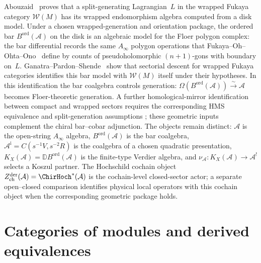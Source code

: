 \begin{remark}
\label{rem:fukaya-bar-koszul}
Abouzaid~\cite{AbouzaidGeneration} proves that a split-generating
Lagrangian~$L$ in the wrapped Fukaya category $\mathcal{W}(M)$ has its
wrapped endomorphism algebra computed from a disk model.
Under a chosen wrapped-generation and orientation package, the ordered
bar \(B^{\mathrm{ord}}(\mathcal A)\) on the disk is an algebraic model
for the Floer polygon complex: the bar differential records the same
$A_\infty$ polygon operations that Fukaya--Oh--Ohta--Ono~\cite{FOOO09}
define by counts of pseudoholomorphic $(n+1)$-gons with boundary
on~$L$.
Ganatra--Pardon--Shende~\cite{GPSSectorialDescent} show that sectorial
descent for wrapped Fukaya categories identifies this bar model with
$\mathcal{W}(M)$ itself under their hypotheses. In this identification
the bar coalgebra controls generation:
$\Omega(B^{\mathrm{ord}}(\mathcal{A})) \xrightarrow{\sim} \mathcal{A}$
becomes Floer-theoretic generation. A further homological-mirror
identification between compact and wrapped sectors requires the
corresponding HMS equivalence and split-generation assumptions
\cite{KontsevichHMS,SeidelBook}; these geometric inputs complement the
chiral bar--cobar adjunction.
The objects remain distinct:
\(\mathcal A\) is the open-string $A_\infty$ algebra,
\(B^{\mathrm{ord}}(\mathcal A)\) is the bar coalgebra,
\(\mathcal A^{\mathrm i}=C(s^{-1}V,s^{-2}R)\) is the coalgebra of a
chosen quadratic presentation,
\(K_X(\mathcal A)=\mathbb D B^{\mathrm{ord}}(\mathcal A)\) is the
finite-type Verdier algebra, and
\(\nu_{\mathcal A}\colon K_X(\mathcal A)\to\mathcal A^!\) selects a
Koszul partner.  The Hochschild cochain object
$Z^{\mathrm{der}}_{\mathrm{ch}}(\mathcal{A})=\ChirHoch^*(\mathcal A)$
is the cochain-level closed-sector actor; a separate open--closed
comparison identifies physical local operators with this cochain
object when the corresponding geometric package holds.
\end{remark}


\section{Categories of modules and derived equivalences}

